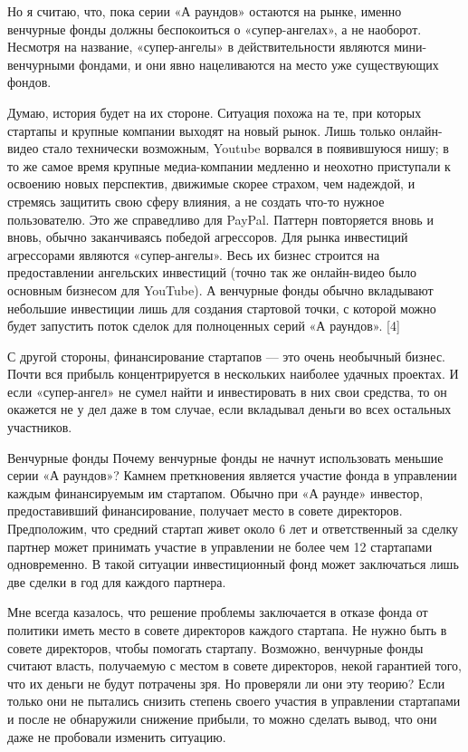 \documentclass[ebook,12pt,oneside,openany]{memoir}
\begin{document}
Но я считаю, что, пока серии «А раундов» остаются на рынке, именно
венчурные фонды должны беспокоиться о «супер-ангелах», а не наоборот.
Несмотря на название, «супер-ангелы» в действительности являются
мини-венчурными фондами, и они явно нацеливаются на место уже
существующих фондов.

Думаю, история будет на их стороне. Ситуация похожа на те, при которых
стартапы и крупные компании выходят на новый рынок. Лишь только
онлайн-видео стало технически возможным, Youtube ворвался в
появившуюся нишу; в то же самое время крупные медиа-компании медленно
и неохотно приступали к освоению новых перспектив, движимые скорее
страхом, чем надеждой, и стремясь защитить свою сферу влияния, а не
создать что-то нужное пользователю. Это же справедливо для PayPal.
Паттерн повторяется вновь и вновь, обычно заканчиваясь победой
агрессоров. Для рынка инвестиций агрессорами являются «супер-ангелы».
Весь их бизнес строится на предоставлении ангельских инвестиций (точно
так же онлайн-видео было основным бизнесом для YouTube). А венчурные
фонды обычно вкладывают небольшие инвестиции лишь для создания
стартовой точки, с которой можно будет запустить поток сделок для
полноценных серий «А раундов». [4]

С другой стороны, финансирование стартапов — это очень необычный
бизнес. Почти вся прибыль концентрируется в нескольких наиболее
удачных проектах. И если «супер-ангел» не сумел найти и инвестировать
в них свои средства, то он окажется не у дел даже в том случае, если
вкладывал деньги во всех остальных участников.

Венчурные фонды Почему венчурные фонды не начнут использовать меньшие
серии «А раундов»? Камнем преткновения является участие фонда в
управлении каждым финансируемым им стартапом. Обычно при «А раунде»
инвестор, предоставивший финансирование, получает место в совете
директоров. Предположим, что средний стартап живет около 6 лет и
ответственный за сделку партнер может принимать участие в управлении
не более чем 12 стартапами одновременно. В такой ситуации
инвестиционный фонд может заключаться лишь две сделки в год для
каждого партнера.

Мне всегда казалось, что решение проблемы заключается в отказе фонда
от политики иметь место в совете директоров каждого стартапа. Не нужно
быть в совете директоров, чтобы помогать стартапу. Возможно, венчурные
фонды считают власть, получаемую с местом в совете директоров, некой
гарантией того, что их деньги не будут потрачены зря. Но проверяли ли
они эту теорию? Если только они не пытались снизить степень своего
участия в управлении стартапами и после не обнаружили снижение
прибыли, то можно сделать вывод, что они даже не пробовали изменить
ситуацию.
\end{document}
